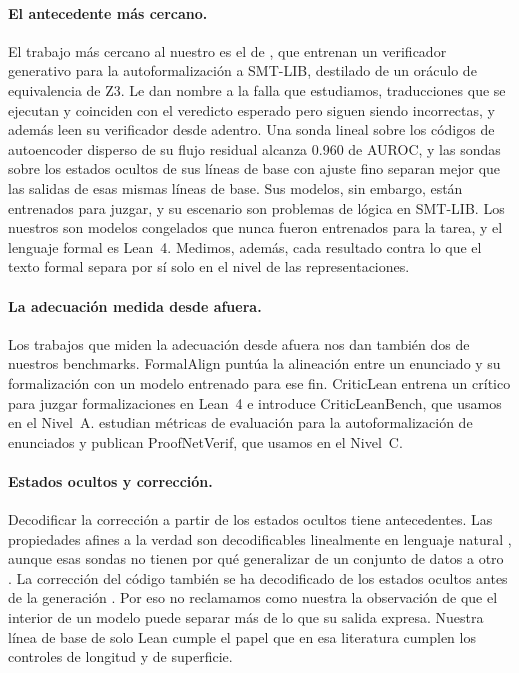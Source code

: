 \documentclass[10pt]{article}
\begin{document}
\paragraph{El antecedente más cercano.}
El trabajo más cercano al nuestro es el de \citet{genv}, que entrenan un verificador generativo para la
autoformalización a SMT-LIB, destilado de un oráculo de equivalencia de Z3. Le dan nombre a la falla que
estudiamos, traducciones que se ejecutan y coinciden con el veredicto esperado pero siguen siendo incorrectas, y
además leen su verificador desde adentro. Una sonda lineal sobre los códigos de autoencoder disperso de su flujo
residual alcanza 0.960 de AUROC, y las sondas sobre los estados ocultos de sus líneas de base con ajuste fino
separan mejor que las salidas de esas mismas líneas de base. Sus modelos, sin embargo, están entrenados para
juzgar, y su escenario son problemas de lógica en SMT-LIB. Los nuestros son modelos congelados que nunca fueron
entrenados para la tarea, y el lenguaje formal es Lean~4. Medimos, además, cada resultado contra lo que el texto
formal separa por sí solo en el nivel de las representaciones.

\paragraph{La adecuación medida desde afuera.}
Los trabajos que miden la adecuación desde afuera nos dan también dos de nuestros benchmarks.
FormalAlign \citep{formalalign} puntúa la alineación entre un enunciado y su formalización con un modelo entrenado
para ese fin. CriticLean \citep{criticlean} entrena un crítico para juzgar formalizaciones en Lean~4 e introduce
CriticLeanBench, que usamos en el Nivel~A. \citet{proofnetverif} estudian métricas de evaluación para la
autoformalización de enunciados y publican ProofNetVerif, que usamos en el Nivel~C.

\paragraph{Estados ocultos y corrección.}
Decodificar la corrección a partir de los estados ocultos tiene antecedentes. Las propiedades afines a la verdad
son decodificables linealmente en lenguaje natural \citep{geometry}, aunque esas sondas no tienen por qué
generalizar de un conjunto de datos a otro \citep{orgad}. La corrección del código también se ha decodificado de
los estados ocultos antes de la generación \citep{dicicco}. Por eso no reclamamos como nuestra la observación de
que el interior de un modelo puede separar más de lo que su salida expresa. Nuestra línea de base de solo Lean
cumple el papel que en esa literatura cumplen los controles de longitud y de superficie.
\end{document}

